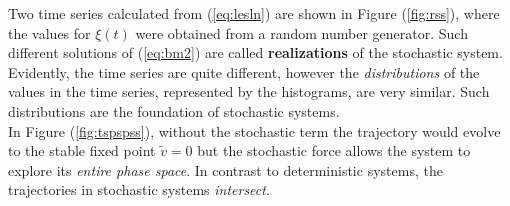Two time series calculated from (\ref{eq:lesln}) are shown in Figure (\ref{fig:rss}), where the values for $\xi(t)$ were obtained from a random number generator.
Such different solutions of (\ref{eq:bm2}) are called \textbf{realizations} of the stochastic system.\\ Evidently, the time series are quite different, however the \emph{distributions} of the values in the time series, represented by the histograms, are very similar.
Such distributions are the foundation of stochastic systems.\\
In Figure (\ref{fig:tspspss}), without the stochastic term the trajectory would evolve to the stable fixed point $\tilde{v}=0$ but the stochastic force allows the system to explore its \emph{entire phase space}.
In contrast to deterministic systems, the trajectories in stochastic systems \emph{intersect}.